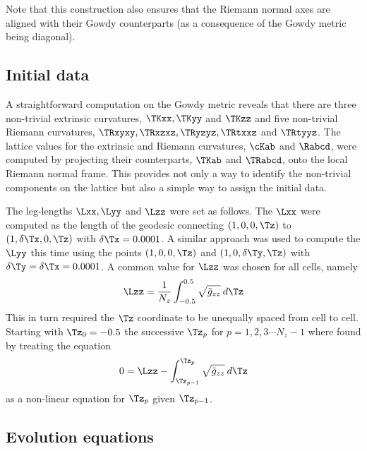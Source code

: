 \documentclass[a4paper,12pt]{article}
\numberwithin{equation}{section}
\begin{document}
Note that this construction also ensures that the Riemann normal axes are aligned with
their Gowdy counterparts (as a consequence of the Gowdy metric being diagonal).

\subsection{Initial data}
\label{sec:GowdyInitialData}

A straightforward computation on the Gowdy metric reveals that there are three non-trivial
extrinsic curvatures, $\TKxx, \TKyy$ and $\TKzz$ and five non-trivial Riemann curvatures,
$\TRxyxy,\TRxzxz,\TRyzyz,\TRtxxz$ and $\TRtyyz$. The lattice values for the extrinsic and
Riemann curvatures, $\cKab$ and $\Rabcd$, were computed by projecting their counterparts,
$\TKab$ and $\TRabcd$, onto the local Riemann normal frame. This provides not only a way to
identify the non-trivial components on the lattice but also a simple way to assign the
initial data.

The leg-lengths $\Lxx,\Lyy$ and $\Lzz$ were set as follows. The $\Lxx$ were computed as the
length of the geodesic connecting $(1,0,0,\Tz)$ to $(1,\delta \Tx,0,\Tz)$ with $\delta
\Tx=0.0001$. A similar approach was used to compute the $\Lyy$ this time using the points
$(1,0,0,\Tz)$ and $(1,0,\delta \Ty,\Tz)$ with $\delta \Ty = \delta \Tx = 0.0001$. A common
value for $\Lzz$ was chosen for all cells, namely
\begin{align}
   \Lzz = \frac{1}{N_z}\int_{-0.5}^{0.5} \sqrt{{\tilde{g}}_{zz}}\>d\Tz
\end{align}
This in turn required the $\Tz$ coordinate to be unequally spaced from cell to cell. Starting
with $\Tz_0=-0.5$ the successive $\Tz_p$ for $p=1,2,3\cdots N_z-1$ where found by treating
the equation
\begin{align}
   0 = \Lzz - \int_{\Tz_{p-1}}^{\Tz_{p}} \sqrt{{\tilde{g}}_{zz}}\>d\Tz
\end{align}
as a non-linear equation for $\Tz_{p}$ given $\Tz_{p-1}$.

\subsection{Evolution equations}
\label{sec:GowdyEqtns}
\end{document}
